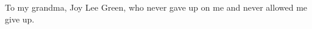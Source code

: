\begin{dedication}
To my grandma, Joy Lee Green, who never gave up on me and never allowed me give up.
\end{dedication}
